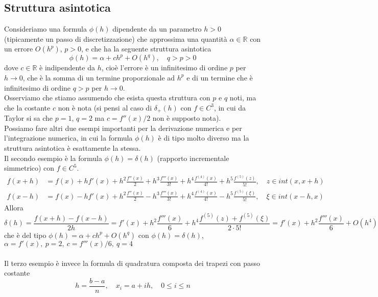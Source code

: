 \documentclass[12pt,a4paper]{article}
\begin{document}
\subsection{Struttura asintotica}
Consideriamo una formula $\phi (h)$ dipendente da un parametro $h>0$ (tipicamente un passo di discretizzazione) che approssima una quantità $\alpha \in \mathbb{R}$ con un errore $O(h^p)$, $p>0$, e che ha la seguente struttura asintotica
\[
\phi (h) = \alpha + ch^p + O(h^q), \quad q>p>0
\]
dove $c \in \mathbb{R}$ è indipendente da $h$, cioè l'errore è un infinitesimo di ordine $p$ per $h \to 0$,
che è la somma di un termine proporzionale ad $h^p$ e di un termine che è infinitesimo di ordine $q>p$ per $h \to 0$.\\
Osserviamo che stiamo assumendo che esista questa struttura con $p$ e $q$ noti, ma che la costante $c$ non è nota (si pensi al caso di $\delta_+ (h)$ con $f \in C^3$, in cui da Taylor si sa che $p=1$, $q=2$ ma $c = f''(x)/2$ non è supposto nota).\\
Possiamo fare altri due esempi
importanti per la derivazione numerica e per l'integrazione numerica, in cui la formula $\phi (h)$ è di tipo molto diverso ma la struttura asintotica è esattamente la stessa.\\
Il secondo esempio è la formula $\phi (h) = \delta (h)$ (rapporto incrementale simmetrico) con $f \in C^5$.\\
\[
\begin{split}
f(x+h) & = f(x) + hf'(x) + h^2 \frac{f''(x)}{2} + h^3 \frac{f'''(x)}{3!} + h^4 \frac{f^{(4)}(x)}{4!} + h^5 \frac{f^{(5)} (z)}{5!}, \quad z \in int(x, x+h) \\
f(x-h) & = f(x) - hf'(x) + h^2 \frac{f''(x)}{2} - h^3 \frac{f'''(x)}{3!} + h^4 \frac{f^{(4)} (x)}{4!} - h^5 \frac{f^{(5)} (\xi)}{5!}, \quad \xi \in int(x-h, x)
\end{split}
\]
Allora
\[
\delta (h) = \frac{f(x+h) - f(x-h)}{2h} = f'(x) + h^2 \frac{f'''(x)}{6} + h^4 \frac{f^{(5)} (z) + f^{(5)} (\xi)}{2 \cdot 5!} = f'(x) + h^2 \frac{f'''(x)}{6} + O(h^4)
\]
che è del tipo $\phi (h) = \alpha + ch^p + O(h^q)$ con $\phi (h) = \delta (h)$, $\alpha = f'(x), \  p=2, \ c=f'''(x)/6, \ q=4$\\\\
Il terzo esempio è invece la formula di quadratura composta dei trapezi con passo costante
\[
h = \frac{b-a}{n}, \quad x_i = a + ih, \quad 0 \le i \le n
\]
\end{document}
